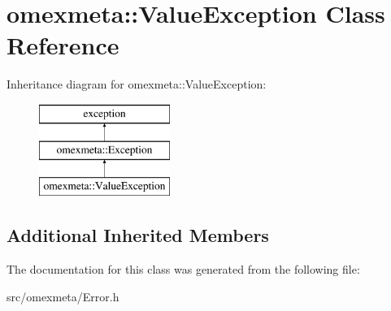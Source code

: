 \hypertarget{classomexmeta_1_1ValueException}{}\section{omexmeta\+:\+:Value\+Exception Class Reference}
\label{classomexmeta_1_1ValueException}
Inheritance diagram for omexmeta\+:\+:Value\+Exception\+:\begin{figure}[H]
\begin{center}
\leavevmode
\includegraphics[height=3.000000cm]{classomexmeta_1_1ValueException}
\end{center}
\end{figure}
\subsection*{Additional Inherited Members}


The documentation for this class was generated from the following file\+:\begin{DoxyCompactItemize}
\item 
src/omexmeta/Error.\+h\end{DoxyCompactItemize}
